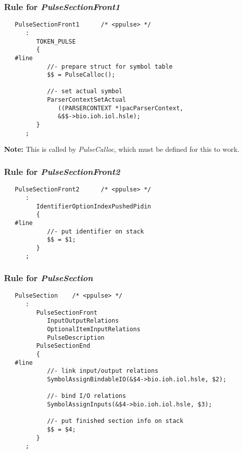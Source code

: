 \documentclass[12pt]{article}
\begin{document}
\subsubsection*{Rule for {\it PulseSectionFront1}}

\begin{verbatim}
   PulseSectionFront1      /* <ppulse> */
      :
         TOKEN_PULSE
         {
   #line
            //- prepare struct for symbol table
            $$ = PulseCalloc();
                    
            //- set actual symbol
            ParserContextSetActual
               ((PARSERCONTEXT *)pacParserContext,
               &$$->bio.ioh.iol.hsle);
         }
      ;
\end{verbatim}
{\bf Note:} This is called by {\it PulseCalloc}, which must be defined for this to work.

\subsubsection*{Rule for {\it PulseSectionFront2}}

\begin{verbatim}
   PulseSectionFront2      /* <ppulse> */
      :
         IdentifierOptionIndexPushedPidin
         {
   #line
            //- put identifier on stack
            $$ = $1;
         }
      ;
\end{verbatim}

\subsubsection*{Rule for {\it PulseSection}}

\begin{verbatim}
   PulseSection    /* <ppulse> */
      :
         PulseSectionFront
            InputOutputRelations
            OptionalItemInputRelations
            PulseDescription
         PulseSectionEnd
         {
   #line
            //- link input/output relations
            SymbolAssignBindableIO(&$4->bio.ioh.iol.hsle, $2);
                    
            //- bind I/O relations
            SymbolAssignInputs(&$4->bio.ioh.iol.hsle, $3);
                    
            //- put finished section info on stack
            $$ = $4;
         }
      ;
\end{verbatim}
\end{document}
